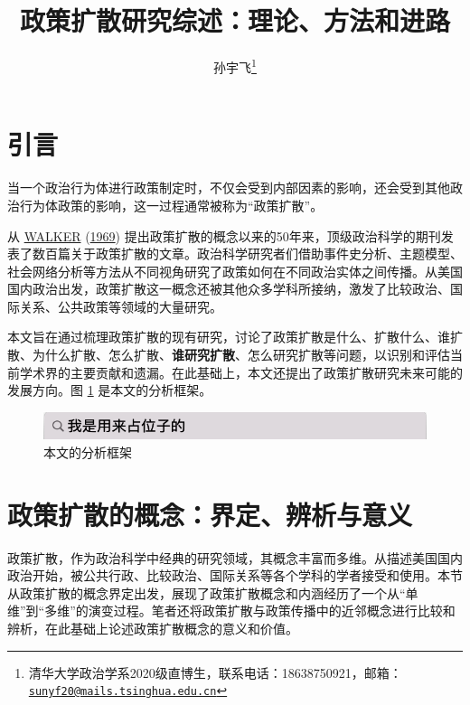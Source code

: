 \documentclass[
  12pt,
]{ctexart}
\title{政策扩散研究综述：理论、方法和进路}
\author{孙宇飞\footnote{清华大学政治学系2020级直博生，联系电话：18638750921，邮箱：\href{mailto:sunyf20@mails.tsinghua.edu.cn}{\nolinkurl{sunyf20@mails.tsinghua.edu.cn}}}}
\date{}
\begin{document}
\maketitle

{
\hypersetup{linkcolor=}
\setcounter{tocdepth}{2}
\tableofcontents
}
\newpage

\hypertarget{ux5f15ux8a00}{%
\section{引言}\label{ux5f15ux8a00}}

当一个政治行为体进行政策制定时，不仅会受到内部因素的影响，还会受到其他政治行为体政策的影响，这一过程通常被称为``政策扩散''。

从 \protect\hyperlink{ref-Walker1969}{WALKER} (\protect\hyperlink{ref-Walker1969}{1969}) 提出政策扩散的概念以来的50年来，顶级政治科学的期刊发表了数百篇关于政策扩散的文章。政治科学研究者们借助事件史分析、主题模型、社会网络分析等方法从不同视角研究了政策如何在不同政治实体之间传播。从美国国内政治出发，政策扩散这一概念还被其他众多学科所接纳，激发了比较政治、国际关系、公共政策等领域的大量研究。

本文旨在通过梳理政策扩散的现有研究，讨论了政策扩散是什么、扩散什么、谁扩散、为什么扩散、怎么扩散、\textbf{谁研究扩散}、怎么研究扩散等问题，以识别和评估当前学术界的主要贡献和遗漏。在此基础上，本文还提出了政策扩散研究未来可能的发展方向。图 \ref{fig:frame} 是本文的分析框架。

\begin{figure}
\includegraphics[width=1\linewidth]{../figures/占位子的图} \caption{本文的分析框架}\label{fig:frame}
\end{figure}

\newpage

\hypertarget{ux653fux7b56ux6269ux6563ux7684ux6982ux5ff5ux754cux5b9aux8fa8ux6790ux4e0eux610fux4e49}{%
\section{政策扩散的概念：界定、辨析与意义}\label{ux653fux7b56ux6269ux6563ux7684ux6982ux5ff5ux754cux5b9aux8fa8ux6790ux4e0eux610fux4e49}}

政策扩散，作为政治科学中经典的研究领域，其概念丰富而多维。从描述美国国内政治开始，被公共行政、比较政治、国际关系等各个学科的学者接受和使用。本节从政策扩散的概念界定出发，展现了政策扩散概念和内涵经历了一个从``单维''到``多维''的演变过程。笔者还将政策扩散与政策传播中的近邻概念进行比较和辨析，在此基础上论述政策扩散概念的意义和价值。
\end{document}

